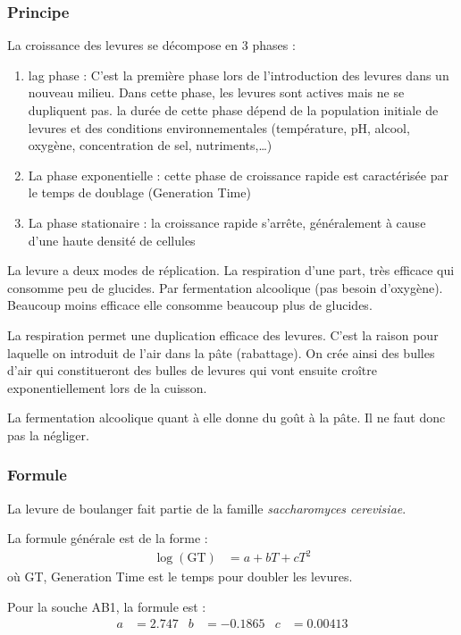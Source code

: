 \documentclass[a4paper,twoside,openright]{report}
\begin{document}
\subsubsection{Principe}
La croissance des levures se décompose en 3 phases :
\begin{enumerate}
\item lag phase : C'est la première phase lors de l'introduction des levures dans un nouveau milieu. Dans cette phase, les levures sont actives mais ne se dupliquent pas. la durée de cette phase dépend de la population initiale de levures et des conditions environnementales (température, pH, alcool, oxygène, concentration de sel, nutriments,\dots)
\item La phase exponentielle : cette phase de croissance rapide est caractérisée par le temps de doublage (Generation Time)
\item La phase stationaire : la croissance rapide s'arrête, généralement à cause d'une haute densité de cellules
\end{enumerate}

La levure a deux modes de réplication. La respiration d'une part, très efficace qui consomme peu de glucides. Par fermentation 
alcoolique (pas besoin d'oxygène). Beaucoup moins efficace elle consomme beaucoup plus de glucides. 

La respiration permet une 
duplication efficace des levures. C'est la raison pour laquelle on introduit de l'air dans la pâte (rabattage). On crée ainsi 
des bulles d'air qui constitueront des bulles de levures qui vont ensuite croître exponentiellement lors de la cuisson. 

La fermentation alcoolique quant à elle donne du goût à la pâte. Il ne faut donc pas la négliger. 


\subsubsection{Formule}
La levure de boulanger fait partie de la famille \emph{saccharomyces cerevisiae}.

La formule générale est de la forme :
\begin{align}
\log(\mathrm{GT}) &= a + bT + cT^2
\end{align}
où GT, Generation Time est le temps pour doubler les levures.

Pour la souche AB1, la formule est :
\begin{align}
a&= 2.747 & b&= -0.1865 & c&= 0.00413
\end{align}
\end{document}
